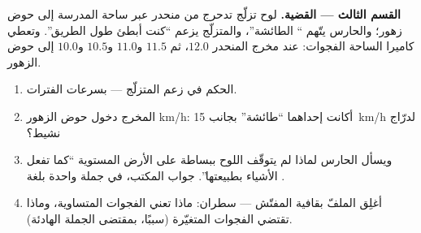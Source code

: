 \begin{problem}
\medskip\noindent\textbf{القسم الثالث --- القضية.}
لوح تزلّج تدحرج من منحدر عبر ساحة المدرسة إلى حوض زهور؛
والحارس يتّهم `` الطائشة''، والمتزلّج يزعم ``كنت أبطئ
طول الطريق''. وتعطي كاميرا الساحة الفجوات: عند مخرج المنحدر
$12.0$، ثم $11.5$ و$11.0$ و$10.5$ و$10.0$ إلى حوض الزهور.
\begin{enumerate}[resume]
  \item الحكم في زعم المتزلّج --- بسرعات الفترات.
  \item {} المخرج  دخول حوض الزهور  \unit{km/h}:
        أكانت إحداهما ``طائشة'' بجانب \qty{15}{km/h} لدرّاج
        نشيط؟
  \item ويسأل الحارس لماذا لم يتوقّف اللوح ببساطة على الأرض
        المستوية ``كما تفعل الأشياء بطبيعتها''. جواب المكتب،
        في جملة واحدة بلغة .
  \item أغلِق الملفّ بقافية المفتّش --- سطران: ماذا تعني
        الفجوات المتساوية، وماذا تقتضي الفجوات المتغيّرة
        (سببًا، بمقتضى الجملة الهادئة).
\end{enumerate}
\end{problem}
